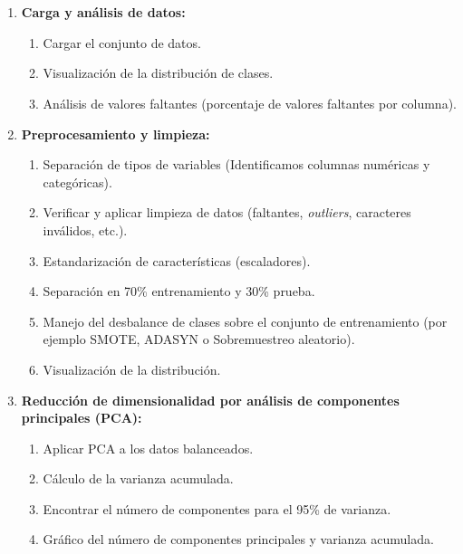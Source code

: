 \documentclass{article}
\begin{document}
\\\\
\begin{enumerate}
  \item \textbf{Carga y análisis de datos:} 
    \begin{enumerate}
      \item Cargar el conjunto de datos.
      \item Visualización de la distribución de clases.
      \item Análisis de valores faltantes (porcentaje de valores faltantes por columna).
     
    \end{enumerate}
  \item \textbf{Preprocesamiento y limpieza:}
    \begin{enumerate}
    \item Separación de tipos de variables (Identificamos columnas numéricas y categóricas).
    \item Verificar y aplicar limpieza de datos (faltantes, \textit{outliers}, caracteres inválidos, etc.).
    
      \item Estandarización de características (escaladores).
      \item Separación en 70\% entrenamiento y 30\% prueba.
      \item Manejo del desbalance de clases  sobre el conjunto de entrenamiento (por ejemplo SMOTE, ADASYN o Sobremuestreo aleatorio).
      \item Visualización  de la distribución.
    \end{enumerate}
 \item \textbf{Reducción de dimensionalidad por análisis de componentes principales (PCA):}
    \begin{enumerate}
        \item Aplicar PCA a los datos balanceados.
        \item Cálculo de la varianza acumulada.
        \item Encontrar el número de componentes para el 95\% de varianza.
        \item Gráfico del número de componentes principales y varianza acumulada.
    \end{enumerate}


\end{enumerate}
\end{document}
